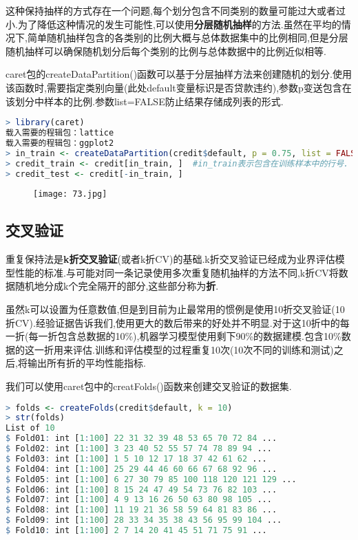 \documentclass[11pt,a4paper,oneside]{book}
\begin{document}
这种保持抽样的方式存在一个问题,每个划分包含不同类别的数量可能过大或者过小.为了降低这种情况的发生可能性,可以使用\textbf{分层随机抽样}的方法.虽然在平均的情况下,简单随机抽样包含的各类别的比例大概与总体数据集中的比例相同,但是分层随机抽样可以确保随机划分后每个类别的比例与总体数据中的比例近似相等.

caret包的createDataPartition()函数可以基于分层抽样方法来创建随机的划分.使用该函数时,需要指定类别向量(此处default变量标识是否贷款违约),参数p变送包含在该划分中样本的比例.参数list=FALSE防止结果存储成列表的形式.
\begin{lstlisting}[language=r]
> library(caret)
载入需要的程辑包：lattice
载入需要的程辑包：ggplot2
> in_train <- createDataPartition(credit$default, p = 0.75, list = FALSE)
> credit_train <- credit[in_train, ]  #in_train表示包含在训练样本中的行号.
> credit_test <- credit[-in_train, ]
\end{lstlisting}
\begin{figure}[H]
	\centering
	\texttt{[image: 73.jpg]}
\end{figure}

\subsection{交叉验证}
重复保持法是\textbf{k折交叉验证}(或者k折CV)的基础.k折交叉验证已经成为业界评估模型性能的标准.与可能对同一条记录使用多次重复随机抽样的方法不同,k折CV将数据随机地分成k个完全隔开的部分,这些部分称为\textbf{折}.

虽然k可以设置为任意数值,但是到目前为止最常用的惯例是使用10折交叉验证(10折CV).经验证据告诉我们,使用更大的数后带来的好处并不明显.对于这10折中的每一折(每一折包含总数据的10\%),机器学习模型使用剩下90\%的数据建模.包含10\%数据的这一折用来评估.训练和评估模型的过程重复10次(10次不同的训练和测试)之后,将输出所有折的平均性能指标.

我们可以使用caret包中的creatFolds()函数来创建交叉验证的数据集.
\begin{lstlisting}[language=r]
> folds <- createFolds(credit$default, k = 10)
> str(folds)
List of 10
$ Fold01: int [1:100] 22 31 32 39 48 53 65 70 72 84 ...
$ Fold02: int [1:100] 3 23 40 52 55 57 74 78 89 94 ...
$ Fold03: int [1:100] 1 5 10 12 17 18 37 42 61 62 ...
$ Fold04: int [1:100] 25 29 44 46 60 66 67 68 92 96 ...
$ Fold05: int [1:100] 6 27 30 79 85 100 118 120 121 129 ...
$ Fold06: int [1:100] 8 15 24 47 49 54 73 76 82 103 ...
$ Fold07: int [1:100] 4 9 13 16 26 50 63 80 98 105 ...
$ Fold08: int [1:100] 11 19 21 36 58 59 64 81 83 86 ...
$ Fold09: int [1:100] 28 33 34 35 38 43 56 95 99 104 ...
$ Fold10: int [1:100] 2 7 14 20 41 45 51 71 75 91 ...
\end{lstlisting}
\end{document}
